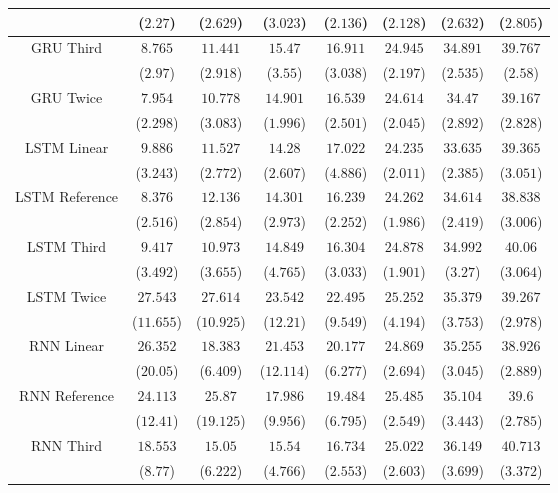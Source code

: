 \begin{table}[!ht]
{\begin{tabular}{|c|c|c|c|c|c|c|c|}
			 & ($2.27$) & ($2.629$) & ($3.023$) & ($2.136$) & ($2.128$) & ($2.632$) & ($2.805$) \\ \hline
			\multirow{2}{*}{GRU Third} & $8.765$ & $11.441$ & $15.47$ & $16.911$ & $24.945$ & $34.891$ & $39.767$ \\
			 & ($2.97$) & ($2.918$) & ($3.55$) & ($3.038$) & ($2.197$) & ($2.535$) & ($2.58$) \\ \hline
			\multirow{2}{*}{GRU Twice} & $7.954$ & $10.778$ & $14.901$ & $16.539$ & $24.614$ & $34.47$ & $39.167$ \\
			 & ($2.298$) & ($3.083$) & ($1.996$) & ($2.501$) & ($2.045$) & ($2.892$) & ($2.828$) \\ \hline
			\multirow{2}{*}{LSTM Linear} & $9.886$ & $11.527$ & $14.28$ & $17.022$ & $24.235$ & $33.635$ & $39.365$ \\
			 & ($3.243$) & ($2.772$) & ($2.607$) & ($4.886$) & ($2.011$) & ($2.385$) & ($3.051$) \\ \hline
			\multirow{2}{*}{LSTM Reference} & $8.376$ & $12.136$ & $14.301$ & $16.239$ & $24.262$ & $34.614$ & $38.838$ \\
			 & ($2.516$) & ($2.854$) & ($2.973$) & ($2.252$) & ($1.986$) & ($2.419$) & ($3.006$) \\ \hline
			\multirow{2}{*}{LSTM Third} & $9.417$ & $10.973$ & $14.849$ & $16.304$ & $24.878$ & $34.992$ & $40.06$ \\
			 & ($3.492$) & ($3.655$) & ($4.765$) & ($3.033$) & ($1.901$) & ($3.27$) & ($3.064$) \\ \hline
			\multirow{2}{*}{LSTM Twice} & $27.543$ & $27.614$ & $23.542$ & $22.495$ & $25.252$ & $35.379$ & $39.267$ \\
			 & ($11.655$) & ($10.925$) & ($12.21$) & ($9.549$) & ($4.194$) & ($3.753$) & ($2.978$) \\ \hline
			\multirow{2}{*}{RNN Linear} & $26.352$ & $18.383$ & $21.453$ & $20.177$ & $24.869$ & $35.255$ & $38.926$ \\
			 & ($20.05$) & ($6.409$) & ($12.114$) & ($6.277$) & ($2.694$) & ($3.045$) & ($2.889$) \\ \hline
			\multirow{2}{*}{RNN Reference} & $24.113$ & $25.87$ & $17.986$ & $19.484$ & $25.485$ & $35.104$ & $39.6$ \\
			 & ($12.41$) & ($19.125$) & ($9.956$) & ($6.795$) & ($2.549$) & ($3.443$) & ($2.785$) \\ \hline
			\multirow{2}{*}{RNN Third} & $18.553$ & $15.05$ & $15.54$ & $16.734$ & $25.022$ & $36.149$ & $40.713$ \\
			 & ($8.77$) & ($6.222$) & ($4.766$) & ($2.553$) & ($2.603$) & ($3.699$) & ($3.372$) \\ \hline

\end{tabular}}
\end{table}
